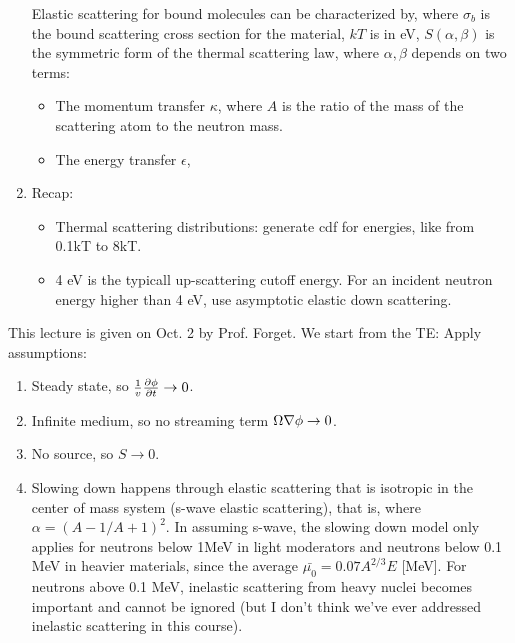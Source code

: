 \documentclass{school-22.211-notes}
\begin{document}
\begin{enumerate}
  Elastic scattering for bound molecules can be characterized by,
  where $\sigma_b$ is the bound scattering cross section for the material, $kT$ is in eV, $S(\alpha, \beta)$ is the symmetric form of the thermal scattering law,
  where $\alpha, \beta$ depends on two terms:
  \begin{itemize}
  \item The momentum transfer $\kappa$,
    where $A$ is the ratio of the mass of the scattering atom to the neutron mass.
  \item The energy transfer $\epsilon$,
  \end{itemize}

\item Recap: 
  \begin{itemize}
  \item Thermal scattering distributions: generate cdf for energies, like from 0.1kT to 8kT.  
  \item 4 eV is the typicall up-scattering cutoff energy. For an incident neutron energy higher than 4 eV, use asymptotic elastic down scattering. 
  \end{itemize}
\end{enumerate}


\clearpage
{} \label{slowing-down-from-te}
This lecture is given on Oct. 2 by Prof. Forget. We start from the TE: 
Apply assumptions:
\begin{enumerate}
\item Steady state, so $\frac{1}{v} \frac{\partial \phi}{\partial t} \to 0$. 
\item Infinite medium, so no streaming term $\Omega \nabla \phi \to 0$. 
\item No source, so $S \to 0$. 
\item Slowing down happens through elastic scattering that is isotropic in the center of mass system (s-wave elastic scattering), that is, 
  where $\alpha = (A-1/A+1)^2$. In assuming s-wave, the slowing down model only applies for neutrons below 1MeV in light moderators and neutrons below 0.1 MeV in heavier materials, since the average $\bar{\mu_0} = 0.07 A^{2/3}E$ [MeV].  For neutrons above 0.1 MeV, inelastic scattering from heavy nuclei becomes important and cannot be ignored (but I don't think we've ever addressed inelastic scattering in this course).
\end{enumerate}
\end{document}
